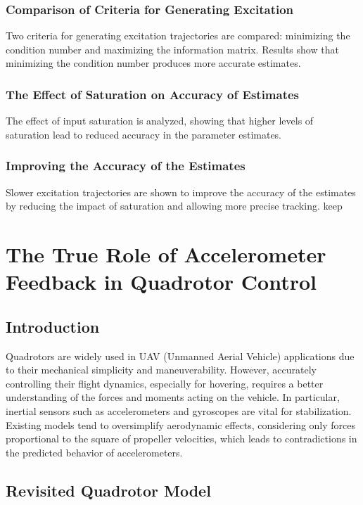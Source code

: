 \documentclass[a4paper,12pt]{article}
\begin{document}
    \subsubsection{Comparison of Criteria for Generating Excitation}
    Two criteria for generating excitation trajectories are compared: minimizing the condition number and maximizing the information matrix. Results show that minimizing the condition number produces more accurate estimates.
    \subsubsection{The Effect of Saturation on Accuracy of Estimates}
    The effect of input saturation is analyzed, showing that higher levels of saturation lead to reduced accuracy in the parameter estimates.
    \subsubsection{Improving the Accuracy of the Estimates}
    Slower excitation trajectories are shown to improve the accuracy of the estimates by reducing the impact of saturation and allowing more precise tracking.
    keep

\section{The True Role of Accelerometer Feedback in Quadrotor Control}

    \subsection{Introduction}
    Quadrotors are widely used in UAV (Unmanned Aerial Vehicle) applications due to their mechanical simplicity and maneuverability. However, accurately controlling their flight dynamics, especially for hovering, requires a better understanding of the forces and moments acting on the vehicle. In particular, inertial sensors such as accelerometers and gyroscopes are vital for stabilization. Existing models tend to oversimplify aerodynamic effects, considering only forces proportional to the square of propeller velocities, which leads to contradictions in the predicted behavior of accelerometers.

    \subsection{Revisited Quadrotor Model}
\end{document}
